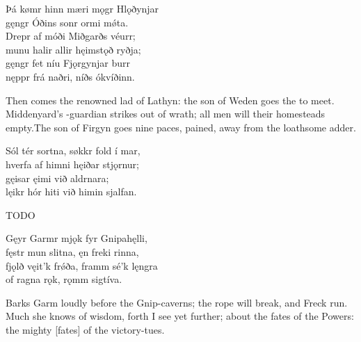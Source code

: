 \bva Þá kømr hinn mæri \hld mǫgr Hlǫðynjar \\%
gęngr Óðins sonr \hld ormi mǿta. \\%
Drepr af móði \hld Miðgarðs véurr; \\%
munu halir allir \hld hęimstǫð ryðja; \\%
gęngr fet níu \hld Fjǫrgynjar burr \\%
nęppr frá naðri, \hld níðs ókvíðinn.\footnotemark[1]\eva
{}

\bvb Then comes the renowned lad of Lathyn: the son of Weden goes the  to meet. Middenyard’s -guardian strikes out of wrath; all men will their homesteads empty.\footnotemark[1] The son of Firgyn goes nine paces, pained, away from the loathsome adder.\footnotemark[2]\evb
{}

\bva Sól tér sortna, \hld søkkr fold í mar, \\%
hverfa af himni \hld hęiðar stjǫrnur; \\%
gęisar ęimi \hld við aldrnara; \\%
lęikr hór hiti \hld við himin sjalfan.\eva

\bvb TODO\evb

\bva Gęyr Garmr mjǫk \hld fyr Gnipahęlli, \\%
fęstr mun slitna, \hld ęn freki rinna, \\%
fjǫlð vęit’k frǿða, \hld framm sé’k lęngra \\%
of ragna rǫk, \hld rǫmm sigtíva.\eva

\bvb Barks Garm loudly before the Gnip-caverns; the rope will break, and Freck run. Much she knows of wisdom, forth I see yet further; about the fates of the Powers: the mighty [fates] of the victory-tues.\evb

